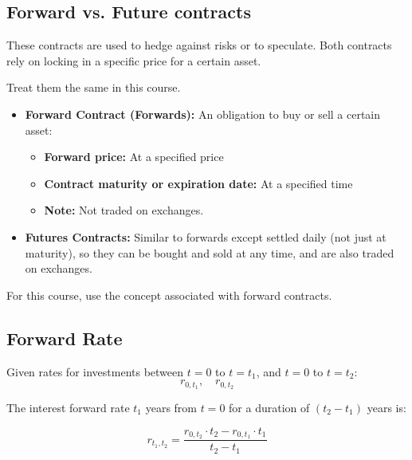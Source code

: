 \subsection{Forward vs. Future contracts}
These contracts are used to hedge against risks or to speculate. Both contracts rely on locking in a specific price for a certain asset.
\begin{warning}
    Treat them the same in this course.
\end{warning}

\begin{terminology}
    \begin{itemize}
        \item \textbf{Forward Contract (Forwards):} An obligation to buy or sell a certain asset:
        \begin{itemize}
            \item \textbf{Forward price:} At a specified price 
            \item \textbf{Contract maturity or expiration date:} At a specified time
            \item \textbf{Note:} Not traded on exchanges.
        \end{itemize}
        
        \item \textbf{Futures Contracts:} Similar to forwards except settled daily (not just at maturity), so they can be bought and sold at any time, and are also traded on exchanges.
    \end{itemize}
\end{terminology}

\begin{intuition}
\end{intuition}

\begin{warning}
    For this course, use the concept associated with forward contracts.
\end{warning}

\subsection{Forward Rate}
\begin{definition}
    Given rates for investments between $t=0$ to $t=t_1$, and $t=0$ to $t=t_2$:
    \[
    r_{0,t_1}, \quad r_{0,t_2}
    \]

    \noindent The interest forward rate $t_1$ years from $t=0$ for a duration of $(t_2 - t_1)$ years is:
    
    \begin{equation}
        r_{t_1,t_2} = \frac{r_{0,t_2} \cdot t_2 - r_{0,t_1} \cdot t_1}{t_2 - t_1}
    \end{equation}            
\end{definition}

